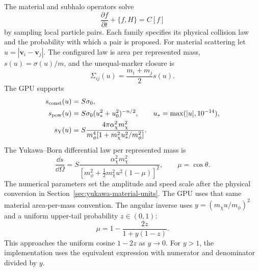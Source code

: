 The material and subhalo operators solve
\begin{equation}
 \frac{\partial f}{\partial t}+\{f,H\}=C[f]
\end{equation}
by sampling local particle pairs. Each family specifies its physical collision
law and the probability with which a pair is proposed.  For material scattering let
\(u=|\bm v_i-\bm v_j|\).  The configured law is area per represented mass,
\(s(u)=\sigma(u)/m\), and the unequal-marker closure is
\begin{equation}
 \Sigma_{ij}(u)=\frac{m_i+m_j}{2}s(u).
\end{equation}
The GPU supports
\begin{align}
 s_{\rm const}(u)&=S\sigma_0,\\
 s_{\rm pow}(u)&=S\sigma_0(u_*^2+u_0^2)^{-n/2},
 \qquad u_*=\max(|u|,10^{-14}),\\
 s_{\rm Y}(u)&=
 S\frac{4\pi\alpha_\chi^2m_\chi^2}
 {m_\phi^4[1+m_\chi^2u_*^2/m_\phi^2]}.
\end{align}
The Yukawa--Born differential law per represented mass is
\begin{equation}
 \frac{\dd s}{\dd\Omega}=
 S\frac{\alpha_\chi^2m_\chi^2}
 {[m_\phi^2+\tfrac12m_\chi^2u^2(1-\mu)]^2},
 \qquad \mu=\cos\theta.
\end{equation}
The numerical parameters set the amplitude and speed scale after the physical
conversion in Section~\ref{sec:yukawa-material-units}.  The GPU uses that same
material area-per-mass convention.
The angular inverse uses \(y=(m_\chi u/m_\phi)^2\) and a uniform
upper-tail probability \(z\in(0,1)\):
\begin{equation}
 \mu=1-\frac{2z}{1+y(1-z)}.
\end{equation}
This approaches the uniform cosine \(1-2z\) as \(y\to0\).  For
\(y>1\), the implementation uses the equivalent expression with numerator
and denominator divided by \(y\).

